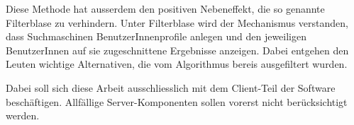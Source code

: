 Diese Methode hat ausserdem den positiven Nebeneffekt, die so genannte
Filterblase zu verhindern. Unter Filterblase wird der Mechanismus verstanden,
dass Suchmaschinen BenutzerInnenprofile anlegen und den jeweiligen BenutzerInnen
auf sie zugeschnittene Ergebnisse anzeigen. Dabei entgehen den Leuten wichtige
Alternativen, die vom Algorithmus bereis ausgefiltert wurden.

Dabei soll sich diese Arbeit ausschliesslich mit dem Client-Teil der Software
beschäftigen. Allfällige Server-Komponenten sollen vorerst nicht berücksichtigt
werden.
